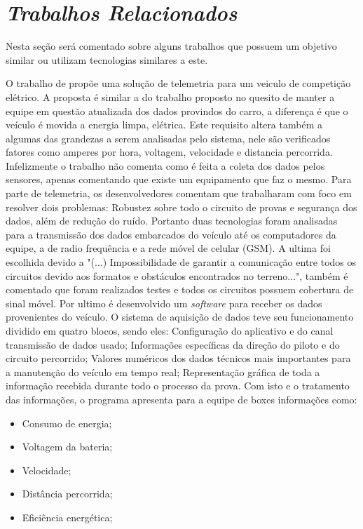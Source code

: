 \chapter{\textit{Trabalhos Relacionados}}
	\label{ch:trabalhos}
Nesta seção será comentado sobre alguns trabalhos que possuem um objetivo similar ou utilizam tecnologias similares a este. 

O trabalho de \cite{gprsTelemetrySystem2013} propõe uma solução de telemetria para um veiculo de competição elétrico. A proposta é similar a do trabalho proposto no quesito de manter a equipe em questão atualizada dos dados provindos do carro, a diferença é que o veículo é movida a energia limpa, elétrica. Este requisito altera também a algumas das grandezas a serem analisadas pelo sistema, nele são verificados fatores como amperes por hora, voltagem, velocidade e distancia percorrida. Infelizmente o trabalho não comenta como é feita a coleta dos dados pelos sensores, apenas comentando que existe um equipamento que faz o mesmo. Para parte de telemetria, os desenvolvedores comentam que trabalharam com foco em resolver dois problemas: Robustez sobre todo o circuito de provas e segurança dos dados, além de redução do ruído. Portanto duas tecnologias foram analisadas para a transmissão dos dados embarcados do veículo até os computadores da equipe, a de radio frequência e a rede móvel de celular (GSM). A ultima foi escolhida devido a "(...) Impossibilidade de garantir a comunicação entre todos os circuitos devido aos formatos e obstáculos encontrados no terreno...", também é comentado que foram realizados testes e todos os circuitos possuem cobertura de sinal móvel. Por ultimo é desenvolvido um \textit{software} para receber os dados provenientes do veículo. O sistema de aquisição de dados teve seu funcionamento dividido em quatro blocos, sendo eles: Configuração do aplicativo e do canal transmissão de dados usado; Informações específicas da direção do piloto e do circuito percorrido; Valores numéricos dos dados técnicos mais importantes para a manutenção do veículo em tempo real; Representação gráfica de toda a informação recebida durante todo o processo da prova. Com isto e o tratamento das informações, o programa apresenta para a equipe de boxes informações como:

\begin{itemize}
	\item Consumo de energia; 
	\item Voltagem da bateria;
	\item Velocidade;
	\item Distância percorrida;
	\item Eficiência energética; 
\end{itemize}

